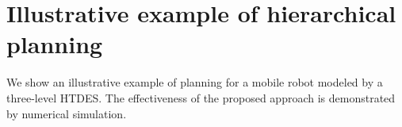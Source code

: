 \documentclass{article}
\newcommand{\tick}{{\sf tick}}
\newcommand{\AP}{{\textit AP}}
\newcommand{\Len}{{\sf L}}
\newcommand{\M}{\mathcal{M}}
\newcommand{\W}{\mathcal{W}}
\newcommand{\red}[1]{\textcolor{red}{#1}}
\begin{document}
\begin{comment}

\begin{algorithm}
\caption{Hierarchical planning: algorithm for finding an overall plan of a HTDES.} \label{alg2}
\begin{algorithmic}
%
\Require $\mathcal{G}$, hard constraints: $\phi^{I_\ell}$, a sets of pairs of a soft constraint and its weight: $\Psi^{I_\ell}$, the length: $\Len_{I_\ell}$, cost functions: $J_\kappa$, $J_{\lambda}$ and $J_{\mu}$, and parameters: $K$, $\Lambda$ and $\mu$.
\Ensure a finite execution of the top-level TDES $\pi_1$.
%
\State $\mathcal{M}=\emptyset,\mathcal{W}=\emptyset$
\For{ $i \in \{1,\ldots,M\}$}
\For{ $j \in \{1,\ldots,M_i\}$}
	\For{ $\kappa\in K$}
		\State ${\pi_{i,j_i}(\kappa)}$ = Find($G_{i,j_i},\phi^{i,j_i},\Psi^{i,j_i}\Len_{i,j_i},J_\kappa$).
		\If{${\pi_{i,j_i}(\kappa)}=\bot$}
		\State \red{$\AP_i\leftarrow \AP_i\setminus \{p_{i,j_i}\}$.}
		\State \red{$L_i(s)\leftarrow L_i(s)\setminus \{p_{i,j_i}\}$ for all $s\in S_i$.}
		\Else
		\State $m_{\pi_{i,j_i}(\kappa)}$
		\State \hspace{0.8cm}$=\left\lceil (\textit{count}_{\pi_{i,j_i}(\kappa)}(0,\Len_{i,j_i})+1)\frac{\tick_{i,j_i}}{\tick_i} \right\rceil $.
		\State Get $W_{\pi_{i,j_i}(\kappa)}$ from $\pi_{i,j_i}(\kappa)$.
		\State $\mathcal{M}_i=\mathcal{M}_i\cup\{m_{\pi_{i,j_i}(\kappa)}\}$.
		\State $\mathcal{W}_i=\mathcal{W}_i\cup\{W_{\pi_{i,j_i}(\kappa)}\}$.
		\EndIf
	\EndFor
\EndFor
\EndFor
\For{ $i \in \{1,\ldots,M\}$}
\For{ $\lambda\in \Lambda$}
		\State ${\pi_i(\lambda)}$ = Find($G_i,\phi^i,\Psi^i,\Len_i,J_{\lambda,\M_i,\W_i}$).
		\If{${\pi_{i}(\lambda)}=\bot$}
		\State \red{$\AP\leftarrow \AP\setminus \{p_{i}\}$.}
		\State \red{$L(s)\leftarrow L(s)\setminus \{p_{i}\}$ for all $s\in S$.}
		\Else
		\State $m_{\pi_i(\lambda)}=\left\lceil (\textit{count}_{\pi_i(\lambda)}(0,\Len_i)+1)\frac{\tick_i}{\tick_p} \right\rceil $.
		\State Get $W_{\pi_i(\lambda)}$ from $\pi_i(\lambda)$.
		\State $\mathcal{M}=\mathcal{M}\cup\{m_{\pi_i(\lambda)}\}$, $\mathcal{W}=\mathcal{W}\cup\{W_{\pi_i(\lambda)}\}$.
		\EndIf
\EndFor
\EndFor
%
\State ${\pi}$ = Find($G,\phi,\Psi,\Len,J_{\mu,\M,\W}$).
\end{algorithmic}
\end{algorithm}
\end{comment}
 
\section{Illustrative example of hierarchical planning}\label{simResult}
%
%
%
We show an illustrative example of planning for a mobile robot modeled by a three-level HTDES. %
The effectiveness of the proposed approach is demonstrated by numerical simulation.
%
\end{document}

